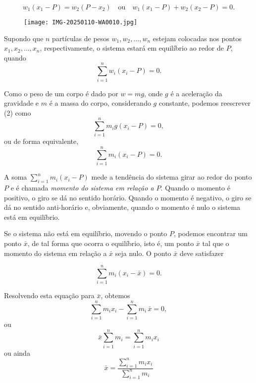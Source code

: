 \documentclass[12pt,a4paper]{report}
\begin{document}
\begin{equation*}
w_1 (x_1 - P) = w_2 (P - x_2) \quad \text{ou} \quad w_1 (x_1 - P) + w_2 (x_2 - P) = 0.
\end{equation*}

\begin{figure}[H]
    \centering
    \texttt{[image: IMG-20250110-WA0010.jpg]} %
    \caption{}
    \label{fig:ce}
\end{figure}

Supondo que $n$ partículas de pesos $w_1, w_2, \dots, w_n$ estejam colocadas nos pontos $x_1, x_2, \dots, x_n$, respectivamente, o sistema estará em equilíbrio ao redor de $P$, quando
\begin{equation}
\sum_{i=1}^n w_i (x_i - P) = 0.
\end{equation}

Como o peso de um corpo é dado por $w = mg$, onde $g$ é a aceleração da gravidade e $m$ é a massa do corpo, considerando $g$ constante, podemos reescrever (2) como
\begin{equation*}
\sum_{i=1}^n m_i g (x_i - P) = 0,
\end{equation*}
ou de forma equivalente,
\begin{equation*}
\sum_{i=1}^n m_i (x_i - P) = 0.
\end{equation*}

A soma $\sum\limits_{i=1}^n m_i (x_i - P)$ mede a tendência do sistema girar ao redor do ponto $P$ e é chamada \textit{momento do sistema em relação a $P$}. Quando o momento é positivo, o giro se dá no sentido horário. Quando o momento é negativo, o giro se dá no sentido anti-horário e, obviamente, quando o momento é nulo o sistema está em equilíbrio.

Se o sistema não está em equilíbrio, movendo o ponto $P$, podemos encontrar um ponto $\bar{x}$, de tal forma que ocorra o equilíbrio, isto é, um ponto $\bar{x}$ tal que o momento do sistema em relação a $\bar{x}$ seja nulo. O ponto $\bar{x}$ deve satisfazer


\begin{equation*}
\sum_{i=1}^n m_i (x_i - \bar{x}) = 0.
\end{equation*}

Resolvendo esta equação para $\bar{x}$, obtemos
\begin{equation*}
\sum_{i=1}^n m_i x_i -  \sum_{i=1}^n m_i\, \bar{x} = 0,
\end{equation*}
ou
\begin{equation*}
\bar{x} \sum_{i=1}^n m_i= \sum_{i=1}^n m_i x_i
\end{equation*}
ou ainda
\begin{equation}
    \bar{x} = \frac{\sum\limits_{i=1}^n m_i x_i}{\sum\limits_{i=1}^n m_i}
\end{equation}
\end{document}
